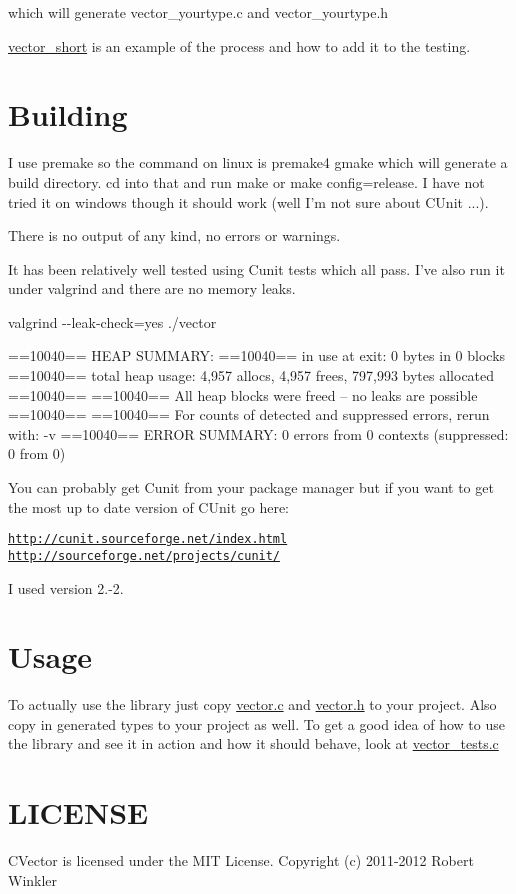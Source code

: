 which will generate vector\-\_\-yourtype.\-c and vector\-\_\-yourtype.\-h

\hyperlink{structvector__short}{vector\-\_\-short} is an example of the process and how to add it to the testing.\hypertarget{index_Building}{}\section{\-Building}\label{index_Building}
\-I use premake so the command on linux is premake4 gmake which will generate a build directory. cd into that and run make or make config=release. \-I have not tried it on windows though it should work (well \-I'm not sure about \-C\-Unit ...).

\-There is no output of any kind, no errors or warnings.

\-It has been relatively well tested using \-Cunit tests which all pass. \-I've also run it under valgrind and there are no memory leaks.

valgrind -\/-\/leak-\/check=yes ./vector


\begin{DoxyPre}
==10040== HEAP SUMMARY:
==10040==     in use at exit: 0 bytes in 0 blocks
==10040==   total heap usage: 4,957 allocs, 4,957 frees, 797,993 bytes allocated
==10040== 
==10040== All heap blocks were freed -- no leaks are possible
==10040== 
==10040== For counts of detected and suppressed errors, rerun with: -v
==10040== ERROR SUMMARY: 0 errors from 0 contexts (suppressed: 0 from 0)
\end{DoxyPre}


\-You can probably get \-Cunit from your package manager but if you want to get the most up to date version of \-C\-Unit go here\-:

\href{http://cunit.sourceforge.net/index.html}{\tt http\-://cunit.\-sourceforge.\-net/index.\-html} \href{http://sourceforge.net/projects/cunit/}{\tt http\-://sourceforge.\-net/projects/cunit/}

\-I used version 2.-\/2.\hypertarget{index_Usage}{}\section{\-Usage}\label{index_Usage}
\-To actually use the library just copy \hyperlink{vector_8c}{vector.\-c} and \hyperlink{vector_8h}{vector.\-h} to your project. \-Also copy in generated types to your project as well. \-To get a good idea of how to use the library and see it in action and how it should behave, look at \hyperlink{vector__tests_8c}{vector\-\_\-tests.\-c}\hypertarget{index_LICENSE}{}\section{\-L\-I\-C\-E\-N\-S\-E}\label{index_LICENSE}
\-C\-Vector is licensed under the \-M\-I\-T \-License. \-Copyright (c) 2011-\/2012 \-Robert \-Winkler

